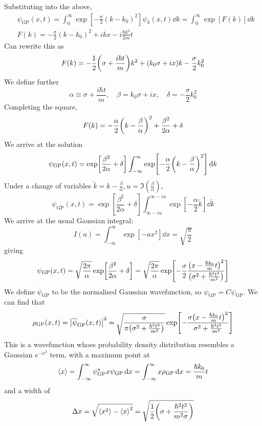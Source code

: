 \documentclass[a4paper]{article}
\begin{document}
Substituting into the above,
\begin{align*}
    &\psi_{\text{GP}}(x,t) = \int_0^\infty \exp[-\frac{\sigma}{2}(k-k_0)^2] \psi_k(x,t) \dd{k} = \int_0^\infty \exp[F(k)] \dd{k}\\ 
    & F(k) = -\frac{\sigma}{2}(k-k_0)^2 + ikx - i \frac{\hbar k^2}{2m} t
\end{align*}
Can rewrite this as
\[
	F(k) = -\frac{1}{2}\qty(\sigma + \frac{i \hbar t}{m}) k^2 + (k_0 \sigma + ix)k - \frac{\sigma}{2} k_0^2
\]
We define further
\[
	\alpha \equiv \sigma + \frac{i \hbar t}{m},\quad \beta = k_0 \sigma + ix,\quad \delta = -\frac{\sigma}{2} k_0^2
\]
Completing the square,
\[
	F(k) = -\frac{\alpha}{2} \qty(k - \frac{\beta}{\alpha})^2 + \frac{\beta^2}{2\alpha} + \delta
\]
We arrive at the solution
\[
	\psi_{\text{GP}}(x,t) = \exp[\frac{\beta^2}{2\alpha} + \delta] \int_{-\infty}^\infty \exp[-\frac{\alpha}{2}\qty(k - \frac{\beta}{\alpha})^2 ] \,\mathrm{d}{k}
\]
Under a change of variables \( \widetilde k = k - \frac{\beta}{\alpha}, u = \Im(\frac{\beta}{\alpha}) \),
\[
	\psi_{\text{GP}}(x,t) = \exp[\frac{\beta^2}{2\alpha} + \delta] \int_{\infty - iu}^{\infty - iu} \exp[-\frac{\alpha}{2} \widetilde k] \dd{\widetilde k}
\]
We arrive at the usual Gaussian integral:
\[
	I(a) = \int_{-\infty}^\infty \exp[-a x^2] \dd{x} = \sqrt{\frac{\pi}{2}}
\]
giving
\[
	\psi_{\text{GP}}(x,t) = \sqrt{\frac{2 \pi}{\alpha}} \exp[\frac{\beta^2}{2\alpha} + \delta] = \sqrt{\frac{2\pi}{\alpha}} \exp[-\frac{\sigma}{2} \frac{\qty(x - \frac{\hbar k_0}{m} t)^2}{\qty(\sigma^2 + \frac{\hbar^2 t^2}{m^2} )} ]
\]
We define \( \overline \psi_{\text{GP}} \) to be the normalised Gaussian wavefunction, so \( \overline \psi_{\text{GP}} = C \psi_{\text{GP}} \).
We can find that
\[
	\rho_{\text{GP}}(x,t) = \abs{\overline \psi_{\text{GP}}(x,t)}^2 = \sqrt{\frac{\sigma}{\pi \qty(\sigma^2 + \frac{\hbar^2 t^2}{m^2})}} \exp[ - \frac{\sigma\qty(x - \frac{\hbar k_0}{m} t)^2}{\sigma^2 + \frac{\hbar^2 t^2}{m^2}} ]
\]
This is a wavefunction whoes probability density distribution resembles a Gaussian \( e^{-x^2} \) term, with a maximum point at
\[
	\left\langle{x}\right\rangle = \int_{-\infty}^\infty \psi_{\text{GP}}^\star x \psi_{\text{GP}} \,\mathrm{d}{x} = \int_{-\infty}^\infty x \rho_{\text{GP}} \,\mathrm{d}{x} = \frac{\hbar k_0}{m} t
\]
and a width of
\[
	\Delta x = \sqrt{\left\langle{x^2}\right\rangle - \left\langle{x}\right\rangle^2} = \sqrt{\frac{1}{2} \qty(\sigma + \frac{\hbar^2 t^2}{m^2 \sigma})}
\]
\end{document}
